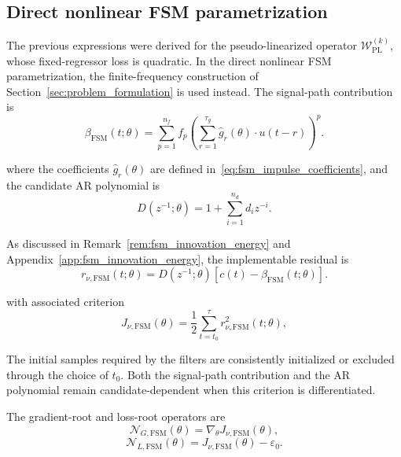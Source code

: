 \documentclass[11pt]{article}
\theoremstyle{remark}
\begin{document}
\subsection{Direct nonlinear FSM parametrization}
\label{subsec:GOTHAM_FSM_parametrization}

The previous expressions were derived for the pseudo-linearized
operator $\mathcal W_{\mathrm{PL}}^{(k)}$, whose fixed-regressor loss is
quadratic. In the direct nonlinear FSM parametrization, the
finite-frequency construction of Section~\ref{sec:problem_formulation}
is used instead. The signal-path contribution is
\begin{equation}
\label{eq:FSM_beta_section4}
    \beta_{\mathrm{FSM}}(t;\theta)
    =
    \sum_{p=1}^{n_f}
    f_p
    \left(
    \sum_{r=1}^{\tau_g}
    \hat g_r(\theta) \cdot u(t-r)
    \right)^p .
\end{equation}

where the coefficients $\hat g_r(\theta)$ are defined
in~\eqref{eq:fsm_impulse_coefficients}, and the candidate AR polynomial is
\begin{equation}
\label{eq:FSM_D_candidate_section4}
    D(z^{-1};\theta)
    =
    1+\sum_{i=1}^{n_d}d_i z^{-i}.
\end{equation}

As discussed in Remark~\ref{rem:fsm_innovation_energy} and
Appendix~\ref{app:fsm_innovation_energy}, the implementable residual is
\begin{equation}
\label{eq:FSM_innovation_residual_filter}
    r_{\nu,\mathrm{FSM}}(t;\theta)
    =
    D(z^{-1};\theta)
    \left[
    c(t)-\beta_{\mathrm{FSM}}(t;\theta)
    \right].
\end{equation}

with associated criterion
\begin{equation}
\label{eq:FSM_innovation_energy_loss}
    J_{\nu,\mathrm{FSM}}(\theta)
    =
    \frac{1}{2}
    \sum_{t=t_0}^{\tau}
    r_{\nu,\mathrm{FSM}}^2(t;\theta),
\end{equation}

The initial samples required by the filters are consistently
initialized or excluded through the choice of $t_0$.
Both the signal-path contribution and the AR polynomial remain
candidate-dependent when this criterion is differentiated.

The gradient-root and loss-root operators are
\begin{equation}
\label{eq:FSM_gradient_root_operator}
    \mathcal{N}_{G,\mathrm{FSM}}(\theta)
    =
    \nabla_{\theta}J_{\nu,\mathrm{FSM}}(\theta),
\end{equation}
\begin{equation}
\label{eq:FSM_loss_root_operator}
    \mathcal{N}_{L,\mathrm{FSM}}(\theta)
    =
    J_{\nu,\mathrm{FSM}}(\theta)-\varepsilon_0.
\end{equation}
\end{document}

